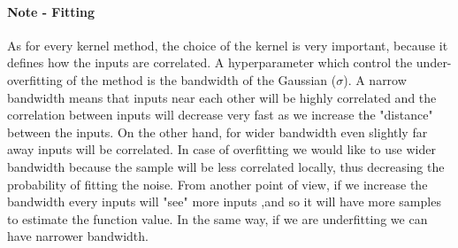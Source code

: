 \documentclass[main.tex]{subfiles}
\begin{document}
\paragraph{Note - Fitting} As for every kernel method, the choice of the kernel is very important, because it defines how the inputs are correlated. A hyperparameter which control the under-overfitting of the method is the bandwidth of the Gaussian ($\sigma$). A narrow bandwidth means that inputs near each other will be highly correlated and the correlation between inputs will decrease very fast as we increase the "distance" between the inputs. On the other hand, for wider bandwidth even slightly far away inputs will be correlated. In case of overfitting we would like to use wider bandwidth because the sample will be less correlated locally, thus decreasing the probability of fitting the noise. From another point of view, if we increase the bandwidth every inputs will "see" more inputs ,and so it will have more samples to estimate the function value. In the same way, if we are underfitting we can have narrower bandwidth.
\end{document}
